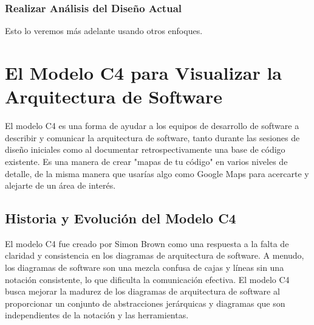 \subsubsection{Realizar Análisis del Diseño Actual}
Esto lo veremos más adelante usando otros enfoques. 
\color{black}























\section{El Modelo C4 para Visualizar la Arquitectura de Software}

El modelo C4 es una forma de ayudar a los equipos de desarrollo de software a describir y comunicar la arquitectura de software, tanto durante las sesiones de diseño iniciales como al documentar retrospectivamente una base de código existente. Es una manera de crear "mapas de tu código" en varios niveles de detalle, de la misma manera que usarías algo como Google Maps para acercarte y alejarte de un área de interés.

\subsection{Historia y Evolución del Modelo C4}
El modelo C4 fue creado por Simon Brown como una respuesta a la falta de claridad y consistencia en los diagramas de arquitectura de software. A menudo, los diagramas de software son una mezcla confusa de cajas y líneas sin una notación consistente, lo que dificulta la comunicación efectiva. El modelo C4 busca mejorar la madurez de los diagramas de arquitectura de software al proporcionar un conjunto de abstracciones jerárquicas y diagramas que son independientes de la notación y las herramientas.

